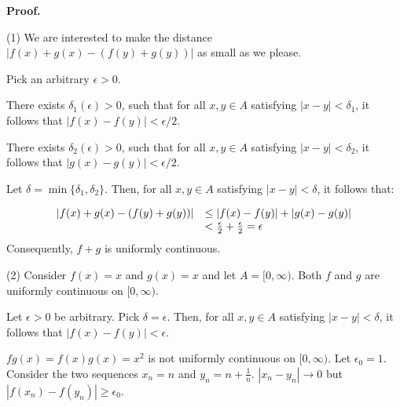 \documentclass[10pt]{article}
\begin{document}
\textbf{Proof.}



(1) We are interested to make the distance $\displaystyle |f( x) +g( x) -( f( y) +g( y)) |$ as small as we please. 



Pick an arbitrary $\displaystyle \epsilon  >0$.



There exists $\displaystyle \delta _{1}( \epsilon )  >0$, such that for all $\displaystyle x,y\in A$ satisfying $\displaystyle |x-y|< \delta _{1}$, it follows that $\displaystyle |f( x) -f( y) |< \epsilon /2$.



There exists $\displaystyle \delta _{2}( \epsilon )  >0$, such that for all $\displaystyle x,y\in A$ satisfying $\displaystyle |x-y|< \delta _{2}$, it follows that $\displaystyle |g( x) -g( y) |< \epsilon /2$. 



Let $\displaystyle \delta =\min\{\delta _{1} ,\delta _{2}\}$. Then, for all $\displaystyle x,y\in A$ satisfying $\displaystyle |x-y|< \delta $, it follows that:


\begin{equation*}
\begin{array}{ c l }
|f( x) +g( x) -( f( y) +g( y)) | & \leq |f( x) -f( y) |+|g( x) -g( y) |\\
 & < \frac{\epsilon }{2} +\frac{\epsilon }{2} =\epsilon 
\end{array}
\end{equation*}
Consequently, $\displaystyle f+g$ is uniformly continuous.



(2) Consider $\displaystyle f( x) =x$ and $\displaystyle g( x) =x$ and let $\displaystyle A=[ 0,\infty )$. Both $\displaystyle f$ and $\displaystyle g$ are uniformly continuous on $\displaystyle [ 0,\infty )$. 



Let $\displaystyle \epsilon  >0$ be arbitrary. Pick $\displaystyle \delta =\epsilon $. Then, for all $\displaystyle x,y\in A$ satisfying $\displaystyle |x-y|< \delta $, it follows that $\displaystyle |f( x) -f( y) |< \epsilon $.



$\displaystyle fg( x) =f( x) g( x) =x^{2}$ is not uniformly continuous on $\displaystyle [ 0,\infty )$. Let $\displaystyle \epsilon _{0} =1$. Consider the two sequences $\displaystyle x_{n} =n$ and $\displaystyle y_{n} =n+\frac{1}{n}$. $\displaystyle |x_{n} -y_{n} |\rightarrow 0$ but $\displaystyle |f( x_{n}) -f( y_{n}) |\geq \epsilon _{0}$.
\end{document}
